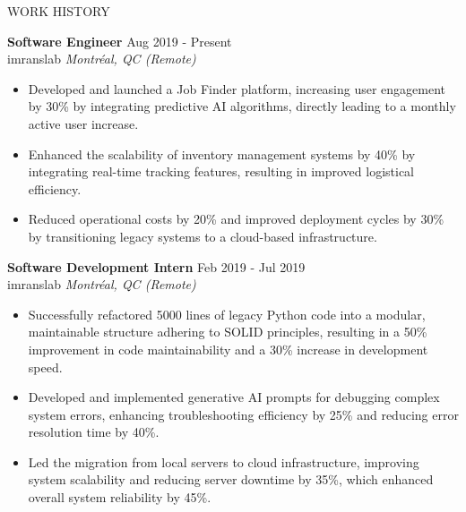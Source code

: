 \documentclass{resume} %
\begin{document}
\begin{rSection}{WORK HISTORY}

\textbf{Software Engineer} \hfill Aug 2019 - Present\\
imranslab \hfill \textit{Montréal, QC (Remote)}
 \begin{itemize}
    \item Developed and launched a Job Finder platform, increasing user engagement by 30\% by integrating predictive AI algorithms, directly leading to a monthly active user increase.
    \item Enhanced the scalability of inventory management systems by 40\% by integrating real-time tracking features, resulting in improved logistical efficiency.
    \item Reduced operational costs by 20\% and improved deployment cycles by 30\% by transitioning legacy systems to a cloud-based infrastructure.
 \end{itemize}

\textbf{Software Development Intern} \hfill Feb 2019 - Jul 2019\\
imranslab \hfill \textit{Montréal, QC (Remote)}
 \begin{itemize}
    \item Successfully refactored 5000 lines of legacy Python code into a modular, maintainable structure adhering to SOLID principles, resulting in a 50\% improvement in code maintainability and a 30\% increase in development speed.
    \item Developed and implemented generative AI prompts for debugging complex system errors, enhancing troubleshooting efficiency by 25\% and reducing error resolution time by 40\%.
    \item Led the migration from local servers to cloud infrastructure, improving system scalability and reducing server downtime by 35\%, which enhanced overall system reliability by 45\%.
 \end{itemize}

\end{rSection} 

\end{document}
